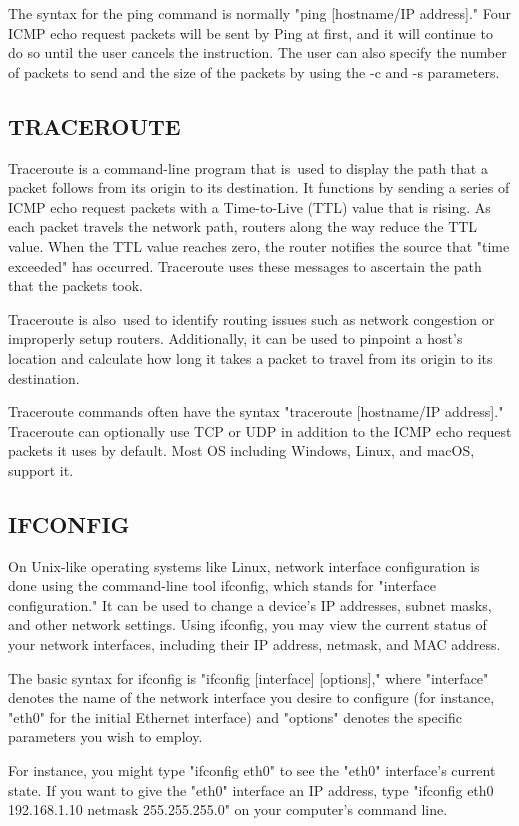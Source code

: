 \documentclass[11pt]{article}
\begin{document}
The syntax for the ping command is normally "ping [hostname/IP address]." Four ICMP echo request packets will be sent by Ping at first, and it will continue to do so until the user cancels the instruction. The user can also specify the number of packets to send and the size of the packets by using the -c and -s parameters.

\subsection{TRACEROUTE}
Traceroute is a command-line program that is used to display the path that a packet follows from its origin to its destination. It functions by sending a series of ICMP echo request packets with a Time-to-Live (TTL) value that is rising. As each packet travels the network path, routers along the way reduce the TTL value. When the TTL value reaches zero, the router notifies the source that "time exceeded" has occurred. Traceroute uses these messages to ascertain the path that the packets took.

Traceroute is also used to identify routing issues such as network congestion or improperly setup routers. Additionally, it can be used to pinpoint a host's location and calculate how long it takes a packet to travel from its origin to its destination.

Traceroute commands often have the syntax "traceroute [hostname/IP address]." Traceroute can optionally use TCP or UDP in addition to the ICMP echo request packets it uses by default. Most OS including Windows, Linux, and macOS, support it.
\subsection{IFCONFIG}
On Unix-like operating systems like Linux, network interface configuration is done using the command-line tool ifconfig, which stands for "interface configuration." It can be used to change a device's IP addresses, subnet masks, and other network settings. Using ifconfig, you may view the current status of your network interfaces, including their IP address, netmask, and MAC address.

The basic syntax for ifconfig is "ifconfig [interface] [options]," where "interface" denotes the name of the network interface you desire to configure (for instance, "eth0" for the initial Ethernet interface) and "options" denotes the specific parameters you wish to employ.

For instance, you might type "ifconfig eth0" to see the "eth0" interface's current state. If you want to give the "eth0" interface an IP address, type "ifconfig eth0 192.168.1.10 netmask 255.255.255.0" on your computer's command line.
\end{document}
